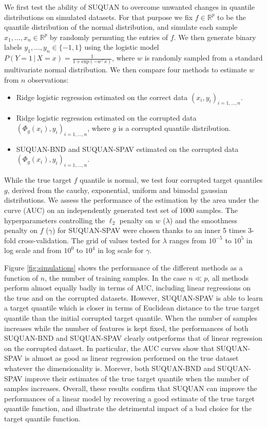 \documentclass{article}
\newcommand{\RR}{\mathbb{R}} %
\begin{document}
We first test the ability of SUQUAN to overcome unwanted changes in quantile distributions on simulated datasets. For that purpose we fix $f\in\RR^p$ to be the quantile distribution of the normal distribution, and simulate each sample $x_1,\ldots,x_n\in\RR^p$ by randomly permuting the entries of $f$. We then generate binary labels $y_1,\ldots,y_n\in\{-1,1\}$ using the logistic model $P(Y=1\,|\,X=x) = \frac{1}{1+\text{exp}(-w^\top x)}$, where $w$ is randomly sampled from a standard multivariate normal distribution. We then compare four methods to estimate $w$ from $n$ observations:
\begin{itemize}
\item Ridge logistic regression estimated on the correct data $(x_i,y_i)_{i=1,\ldots,n}$.
\item Ridge logistic regression estimated on the corrupted data $(\Phi_g(x_i),y_i)_{i=1,\ldots,n}$, where $g$ is a corrupted quantile distribution.
\item SUQUAN-BND and SUQUAN-SPAV estimated on the corrupted data $(\Phi_g(x_i),y_i)_{i=1,\ldots,n}$.
\end{itemize}
While the true target $f$ quantile is normal, we test four corrupted target quantiles $g$, derived from the cauchy, exponential, uniform and bimodal gaussian distributions. We assess the performance of the estimation by the area under the curve (AUC) on an independently generated test set of 1000 samples. The hyperparameters controlling the $\ell_2$ penalty on $w$ ($\lambda$) and the smoothness penalty on $f$ ($\gamma$) for SUQUAN-SPAV were chosen thanks to an inner 5 times 3-fold cross-validation. The grid of values tested for $\lambda$ ranges from $10^{-5}$ to $10^5$ in log scale and from  $10^{0}$ to $10^4$ in log scale for $\gamma$.

Figure \ref{fig:simulations} shows the performance of the different methods as a function of $n$, the number of training samples. In the case $n \ll p$, all methods perform almost equally badly in terms of AUC, including  linear regressions on the true and on the corrupted datasets. However, SUQUAN-SPAV is able to learn a target quantile which is closer in terms of Euclidean distance to the true target quantile than the initial corrupted target quantile. When the number of samples increases while the number of features is kept fixed, the performances of both SUQUAN-BND and SUQUAN-SPAV clearly outperforms that of linear regression on the corrupted dataset. In particular, the AUC curves show that SUQUAN-SPAV is almost as good as linear regression performed on the true dataset whatever the dimensionality is. Morever, both SUQUAN-BND and SUQUAN-SPAV  improve their estimates of the true target quantile when the number of samples increases. Overall, these results confirm that SUQUAN can improve the performances of a linear model by recovering a good estimate of the true target quantile function, and illustrate the detrimental impact of a bad choice for the target quantile function.
\end{document}
